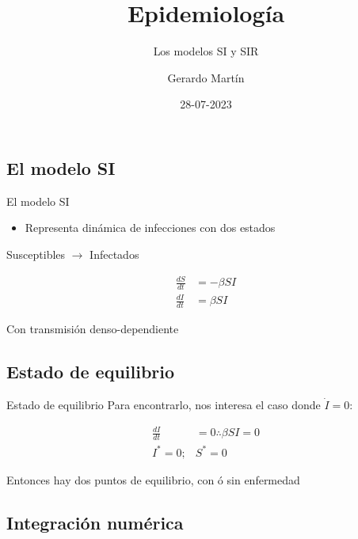 \documentclass[
  11pt,
  ignorenonframetext,
]{beamer}
\title{Epidemiología}
\subtitle{Los modelos SI y SIR}
\author{Gerardo Martín}
\date{28-07-2023}
\providecommand{\tightlist}{%
  \setlength{\itemsep}{0pt}\setlength{\parskip}{0pt}}
\begin{document}
\frame{\titlepage}

\hypertarget{el-modelo-si}{%
\subsection{El modelo SI}\label{el-modelo-si}}

\begin{frame}{El modelo SI}
\begin{itemize}
\tightlist
\item
  Representa dinámica de infecciones con dos estados
\end{itemize}

Susceptibles \(\rightarrow\) Infectados

\begin{align}
\frac{dS}{dt} &= -\beta SI \\
\frac{dI}{dt} &= \beta SI
\end{align}

Con transmisión denso-dependiente
\end{frame}

\hypertarget{estado-de-equilibrio}{%
\subsection{Estado de equilibrio}\label{estado-de-equilibrio}}

\begin{frame}{Estado de equilibrio}
Para encontrarlo, nos interesa el caso donde \(\dot{I} = 0\):

\begin{align}
\frac{dI}{dt} &= 0 \therefore \beta SI = 0\\
I^* = 0; & S^* = 0
\end{align}

Entonces hay dos puntos de equilibrio, con ó sin enfermedad
\end{frame}

\hypertarget{integraciuxf3n-numuxe9rica}{%
\subsection{Integración numérica}\label{integraciuxf3n-numuxe9rica}}
\end{document}
